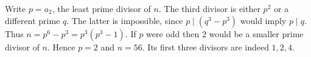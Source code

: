 Write $p=a_2$, the least prime divisor of $n$. The third divisor is either $p^2$ or a different prime $q$. The latter is impossible, since $p\mid(q^3-p^3)$ would imply $p\mid q$. Thus $n=p^6-p^3=p^3(p^3-1)$. If $p$ were odd then $2$ would be a smaller prime divisor of $n$. Hence $p=2$ and $\boxed{n=56}$. Its first three divisors are indeed $1,2,4$.
